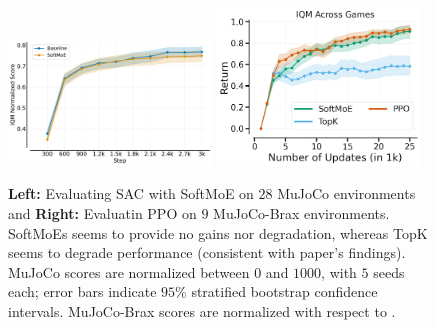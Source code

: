 
\begin{figure}[!h]
    \centering
    \includegraphics[width=0.48\textwidth]{figures/SAC_IQM.pdf} %
    \includegraphics[width=0.48\textwidth]{figures/ppo_brax.png}
    \caption{\textbf{Left:} Evaluating SAC with SoftMoE on $28$ MuJoCo environments and \textbf{Right:} Evaluatin PPO on $9$ MuJoCo-Brax environments. SoftMoEs seems to provide no gains nor degradation, whereas TopK seems to degrade performance (consistent with paper's findings). MuJoCo scores are normalized between $0$ and $1000$, with $5$ seeds each; error bars indicate $95\%$ stratified bootstrap confidence intervals. MuJoCo-Brax scores are normalized with respect to \citet{jesson2023relu}.}
    \label{fig:sacIQM}
    \vspace{-0.2cm}
\end{figure}

